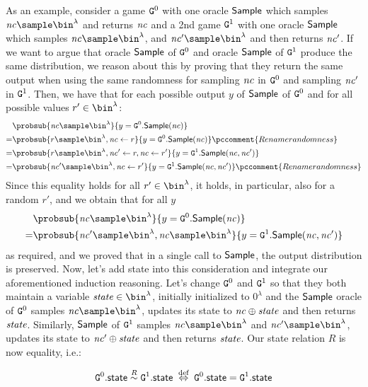 As an example, consider a game $\text{\texttt{G}}^0$ with one oracle $\mathsf{Sample}$ which samples $\n{nc}\sample\bin^\lambda$ and returns $\mathit{nc}$ and a 2nd game $\text{\texttt{G}}^1$ with one oracle $\mathsf{Sample}$ which samples $\n{nc}\sample\bin^\lambda$, and $\n{nc}'\sample\bin^\lambda$ and then returns $\mathit{nc}'$. If we want to argue that oracle $\mathsf{Sample}$ of $\text{\texttt{G}}^0$ and oracle $\mathsf{Sample}$ of $\text{\texttt{G}}^1$ produce the same distribution, we reason about this by proving that they return the same output when using the same randomness for sampling $\mathit{nc}$ in $\text{\texttt{G}}^0$ and sampling $\mathit{nc}'$ in $\text{\texttt{G}}^1$. Then, we have that for each possible output $y$ of $\mathsf{Sample}$ of $\text{\texttt{G}}^0$ and for all possible values $r'\in\bin^\lambda$:
\begin{align*}
 &\probsub{\n{nc}\sample\bin^\lambda}{y=\M{G}^0.\O{Sample}(\n{nc})}\\
=&\probsub{r\sample\bin^\lambda,\n{nc}\gets r}{y=\M{G}^0.\O{Sample}(\n{nc})}\pccomment{Rename randomness}\\
=&\probsub{r\sample\bin^\lambda,\n{nc}'\gets r,\n{nc}\gets r'}{y=\M{G}^1.\O{Sample}(\n{nc},\n{nc}')}\\
=&\probsub{\n{nc}'\sample\bin^\lambda,\n{nc}\gets r'}{y=\M{G}^1.\O{Sample}(\n{nc},\n{nc}')}\pccomment{Rename randomness}
\end{align*}
Since this equality holds for all $r'\in\bin^\lambda$, it holds, in particular, also for a random $r'$, and we obtain that for all $y$
\begin{align}
 &\probsub{\n{nc}\sample\bin^\lambda}{y=\M{G}^0.\O{Sample}(\n{nc})}\notag\\
=&\probsub{\n{nc}'\sample\bin^\lambda,\n{nc}\sample\bin^\lambda}{y=\M{G}^1.\O{Sample}(\n{nc},\n{nc}')}\label{eq:randomnesstryinghard}
\end{align}
as required, and we proved that in a single call to $\mathsf{Sample}$, the output distribution is preserved. Now, let's add state into this consideration and integrate our aforementioned induction reasoning. Let's change $\text{\texttt{G}}^0$ and $\text{\texttt{G}}^1$ so that they both maintain a variable $\n{state}\in\bin^\lambda$, initially initialized to $0^\lambda$ and the $\mathsf{Sample}$ oracle of $\text{\texttt{G}}^0$ samples $\n{nc}\sample\bin^\lambda$, updates its state to $\mathit{nc}\oplus\mathit{state}$ and then returns $\mathit{state}$. Similarly,
$\mathsf{Sample}$ of  $\text{\texttt{G}}^1$ samples $\n{nc}\sample\bin^\lambda$ and $\n{nc}'\sample\bin^\lambda$, updates its state to $\mathit{nc}'\oplus\mathit{state}$ and then returns $\mathit{state}$. Our state relation $R$ is now equality, i.e.:

\[\text{\texttt{G}}^0.\mathsf{state}\stackrel{R}{\sim} \text{\texttt{G}}^1.\mathsf{state}\;\stackrel{\text{def}}{\Leftrightarrow}\;\text{\texttt{G}}^0.\mathsf{state}=\text{\texttt{G}}^1.\mathsf{state}\]

